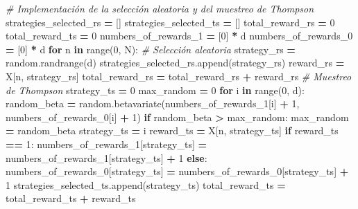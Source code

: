 \documentclass[
]{book}
\newenvironment{Shaded}{\begin{snugshade}}{\end{snugshade}}
\newcommand{\BuiltInTok}[1]{#1}
\newcommand{\CommentTok}[1]{\textcolor[rgb]{0.56,0.35,0.01}{\textit{#1}}}
\newcommand{\ControlFlowTok}[1]{\textcolor[rgb]{0.13,0.29,0.53}{\textbf{#1}}}
\newcommand{\DecValTok}[1]{\textcolor[rgb]{0.00,0.00,0.81}{#1}}
\newcommand{\KeywordTok}[1]{\textcolor[rgb]{0.13,0.29,0.53}{\textbf{#1}}}
\newcommand{\NormalTok}[1]{#1}
\newcommand{\OperatorTok}[1]{\textcolor[rgb]{0.81,0.36,0.00}{\textbf{#1}}}
\begin{document}
\begin{Shaded}
\begin{Highlighting}[]
\CommentTok{\# Implementación de la selección aleatoria y del muestreo de Thompson}
\NormalTok{strategies\_selected\_rs }\OperatorTok{=}\NormalTok{ []}
\NormalTok{strategies\_selected\_ts }\OperatorTok{=}\NormalTok{ []}
\NormalTok{total\_reward\_rs }\OperatorTok{=} \DecValTok{0}
\NormalTok{total\_reward\_ts }\OperatorTok{=} \DecValTok{0}
\NormalTok{numbers\_of\_rewards\_1 }\OperatorTok{=}\NormalTok{ [}\DecValTok{0}\NormalTok{] }\OperatorTok{*}\NormalTok{ d}
\NormalTok{numbers\_of\_rewards\_0 }\OperatorTok{=}\NormalTok{ [}\DecValTok{0}\NormalTok{] }\OperatorTok{*}\NormalTok{ d}
\ControlFlowTok{for}\NormalTok{ n }\KeywordTok{in} \BuiltInTok{range}\NormalTok{(}\DecValTok{0}\NormalTok{, N):}
    \CommentTok{\# Selección aleatoria}
\NormalTok{    strategy\_rs }\OperatorTok{=}\NormalTok{ random.randrange(d)}
\NormalTok{    strategies\_selected\_rs.append(strategy\_rs)}
\NormalTok{    reward\_rs }\OperatorTok{=}\NormalTok{ X[n, strategy\_rs]}
\NormalTok{    total\_reward\_rs }\OperatorTok{=}\NormalTok{ total\_reward\_rs }\OperatorTok{+}\NormalTok{ reward\_rs}
    \CommentTok{\# Muestreo de Thompson}
\NormalTok{    strategy\_ts }\OperatorTok{=} \DecValTok{0}
\NormalTok{    max\_random }\OperatorTok{=} \DecValTok{0}
    \ControlFlowTok{for}\NormalTok{ i }\KeywordTok{in} \BuiltInTok{range}\NormalTok{(}\DecValTok{0}\NormalTok{, d):}
\NormalTok{        random\_beta }\OperatorTok{=}\NormalTok{ random.betavariate(numbers\_of\_rewards\_1[i] }\OperatorTok{+} \DecValTok{1}\NormalTok{,}
\NormalTok{                                         numbers\_of\_rewards\_0[i] }\OperatorTok{+} \DecValTok{1}\NormalTok{)}
        \ControlFlowTok{if}\NormalTok{ random\_beta }\OperatorTok{\textgreater{}}\NormalTok{ max\_random:}
\NormalTok{            max\_random }\OperatorTok{=}\NormalTok{ random\_beta}
\NormalTok{            strategy\_ts }\OperatorTok{=}\NormalTok{ i}
\NormalTok{    reward\_ts }\OperatorTok{=}\NormalTok{ X[n, strategy\_ts]}
    \ControlFlowTok{if}\NormalTok{ reward\_ts }\OperatorTok{==} \DecValTok{1}\NormalTok{:}
\NormalTok{        numbers\_of\_rewards\_1[strategy\_ts] }\OperatorTok{=}\NormalTok{ numbers\_of\_rewards\_1[strategy\_ts] }\OperatorTok{+} \DecValTok{1}
    \ControlFlowTok{else}\NormalTok{:}
\NormalTok{        numbers\_of\_rewards\_0[strategy\_ts] }\OperatorTok{=}\NormalTok{ numbers\_of\_rewards\_0[strategy\_ts] }\OperatorTok{+} \DecValTok{1}
\NormalTok{    strategies\_selected\_ts.append(strategy\_ts)}
\NormalTok{    total\_reward\_ts }\OperatorTok{=}\NormalTok{ total\_reward\_ts }\OperatorTok{+}\NormalTok{ reward\_ts}
\end{Highlighting}
\end{Shaded}
\end{document}
